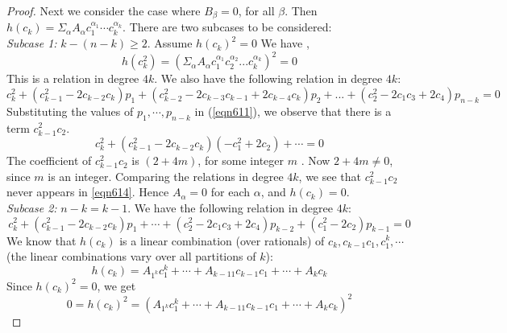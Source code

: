 \documentclass[a4paper,leqno,12pt]{amsart}
\theoremstyle{plain}
\theoremstyle{definition}
\theoremstyle{remark}
\begin{document}
{\begin{proof}
\noindent
Next we consider the case where $B_{\beta} =0$,  for all $\beta$.  Then $h(c_{k}) = \Sigma_{\alpha} A_{\alpha} c_{1}^{\alpha_{1}} \cdots c_{k}^{\alpha_{k}} $.  There are two subcases to be considered: \\
\noindent
{\it Subcase 1:} $ k-(n-k) \geq 2$.  Assume $ h(c_{k})^{2}= 0$ 
We have , 
\begin{equation}
    h(c_{k}^{2}) = (\Sigma_{\alpha} A_{\alpha} c_{1}^{\alpha_{1}}c_{2}^{\alpha_{2}}...c_{k}^{\alpha_{k}})^{2} =0
\label{eqn614}
\end{equation}
\noindent
This is a relation in degree $4k$.  We also have the following relation in degree $4k$:
\begin{equation}
    c_{k}^{2}+(c_{k-1}^{2}-2c_{k-2}c_{k})p_{1}+(c_{k-2}^{2}-2c_{k-3}c_{k-1}+2c_{k-4}c_{k})p_{2}+...+(c_{2}^{2}-2c_{1}c_{3}+2c_{4})p_{n-k} =0
    \nonumber
\end{equation}
\noindent
Substituting the values of $p_{1}, \cdots ,p_{n-k}$ in (\ref{eqn611}),  we  observe that there is a term $c_{k-1}^{2}c_{2}$.
\begin{equation}
  c_{k}^{2}+(c_{k-1}^{2}-2c_{k-2}c_{k})(-c_{1}^{2}+2c_{2})+ \cdots = 0  
\end{equation}
\noindent
The coefficient of $c_{k-1}^{2} c_{2}$ is $(2+4m)$,  for some integer $m$ .  Now $2+4m \neq 0$,  since $m$ is an integer.  Comparing the relations in degree $4k$,  we see that $c_{k-1}^{2}c_{2}$ never appears in \ref{eqn614}.  Hence $A_{\alpha}=0$  for each $\alpha$,  and  $h(c_{k})=0$.\\
\noindent
{\it Subcase 2:} $n-k=k-1$.  
We have the following relation in degree $4k$: 
\begin{equation}
  c_{k}^{2}+(c_{k-1}^{2}-2c_{k-2}c_{k})p_{1}+ \cdots +(c_{2}^{2}-2c_{1}c_{3}+2c_{4})p_{k-2}+ (c_{1}^{2}-2c_{2})p_{k-1} =0
  \label{eqn615}
\end{equation}
\noindent
We know that $h(c_{k})$ is a linear combination (over rationals) of $c_{k}, c_{k-1}c_{1}, c_{1}^{k} ,  \cdots$ (the linear combinations vary over all partitions of $k$): 
\begin{equation}
    h(c_{k}) = A_{{1}^{k}}c_{1}^{k}+ \cdots +A_{{k-11}}c_{k-1}c_{1}+ \cdots +A_{k}c_{k}
    \nonumber
\end{equation}
Since $h(c_{k})^{2}=0$, we get 
\begin{equation}
    0 = h(c_{k})^{2}= (A_{{1}^{k}}c_{1}^{k}+ \cdots +A_{{k-11}}c_{k-1}c_{1}+ \cdots +A_{k}c_{k})^{2}
     \label{eqn616}
\end{equation}

\end{proof}}
\end{document}
